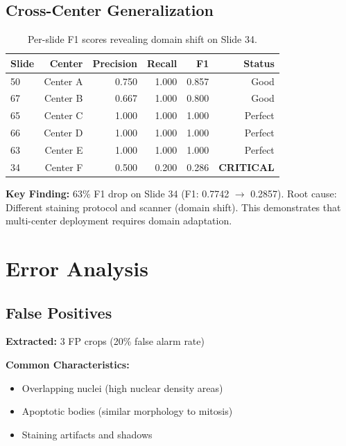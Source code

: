 \documentclass[11pt,a4paper]{article}
\begin{document}
\subsection{Cross-Center Generalization}

\begin{table}[h]
\centering
\caption{Per-slide F1 scores revealing domain shift on Slide 34.}
\label{tab:crosscenter}
\begin{tabular}{lrrrrr}
\toprule
\textbf{Slide} & \textbf{Center} & \textbf{Precision} & \textbf{Recall} & \textbf{F1} & \textbf{Status} \\
\midrule
50 & Center A & 0.750 & 1.000 & 0.857 & Good \\
67 & Center B & 0.667 & 1.000 & 0.800 & Good \\
65 & Center C & 1.000 & 1.000 & 1.000 & Perfect \\
66 & Center D & 1.000 & 1.000 & 1.000 & Perfect \\
63 & Center E & 1.000 & 1.000 & 1.000 & Perfect \\
34 & Center F & 0.500 & 0.200 & 0.286 & \textbf{CRITICAL} \\
\bottomrule
\end{tabular}
\end{table}

\textbf{Key Finding:} 63\% F1 drop on Slide 34 (F1: 0.7742 $\rightarrow$ 0.2857). 
Root cause: Different staining protocol and scanner (domain shift). This 
demonstrates that multi-center deployment requires domain adaptation.

\section{Error Analysis}

\subsection{False Positives}

\textbf{Extracted:} 3 FP crops (20\% false alarm rate)

\textbf{Common Characteristics:}
\begin{itemize}
    \item Overlapping nuclei (high nuclear density areas)
    \item Apoptotic bodies (similar morphology to mitosis)
    \item Staining artifacts and shadows
\end{itemize}
\end{document}
